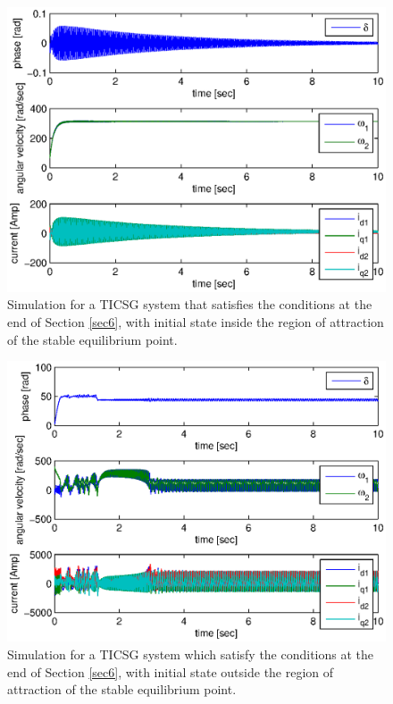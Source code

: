 \documentclass{ifacconf}
\begin{document}
\begin{figure}[ht] %
\vspace{-2mm}
\includegraphics[scale=0.65]{InROATICSGSimulation} \vspace{-8mm}
\caption{Simulation for a TICSG system that satisfies the conditions
at the end of Section \ref{sec6}, with initial state inside the 
region of attraction of the stable equilibrium point.}
\label{fig:InROATICSGSimulation}
\end{figure}

\vspace{-2mm}
\begin{figure}[ht] %
\includegraphics[scale=0.65]{OutROATICSGSimulation} \vspace{-6mm}
\caption{Simulation for a TICSG system which satisfy the conditions at
the end of Section \ref{sec6}, with initial state outside the region
of attraction of the stable equilibrium point.}
\label{fig:OutROATICSGSimulation}
\end{figure}
\end{document}
